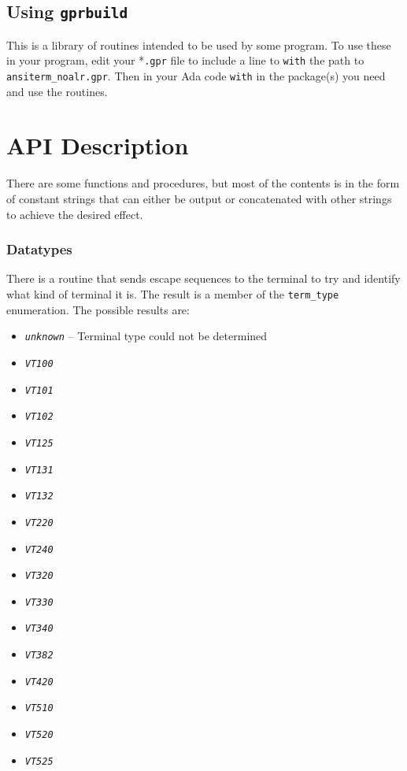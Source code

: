 \documentclass[10pt, openany]{book}
\newcommand{\constant}[1]{\emph{\texttt{#1}}}
\newcommand{\keyword}[1]{\texttt{#1}}
\newcommand{\datatype}[1]{\texttt{#1}}
\begin{document}
\section{Using \keyword{gprbuild}}
This is a library of routines intended to be used by some program.  To use these in your program, edit your *\keyword{.gpr} file to include a line to \keyword{with} the path to \keyword{ansiterm\_noalr.gpr}.  Then in your Ada code \keyword{with} in the package(s) you need and use the routines.

\chapter{API Description}
There are some functions and procedures, but most of the contents is in the form of constant strings that can either be output or concatenated with other strings to achieve the desired effect.

\subsection{Datatypes}
There is a routine that sends escape sequences to the terminal to try and identify what kind of terminal it is.  The result is a member of the \datatype{term\_type} enumeration.  The possible results are:
\begin{itemize}
  \item \constant{unknown} -- Terminal type could not be determined
  \item \constant{VT100}
  \item \constant{VT101}
  \item \constant{VT102}
  \item \constant{VT125}
  \item \constant{VT131}
  \item \constant{VT132}
  \item \constant{VT220}
  \item \constant{VT240}
  \item \constant{VT320}
  \item \constant{VT330}
  \item \constant{VT340}
  \item \constant{VT382}
  \item \constant{VT420}
  \item \constant{VT510}
  \item \constant{VT520}
  \item \constant{VT525}
\end{itemize}
\end{document}
